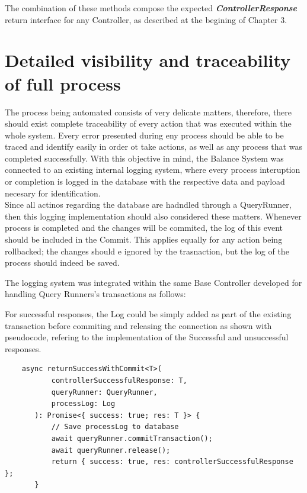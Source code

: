 The combination of these methods compose the expected \textbf{\textit{ControllerResponse}} return interface for any Controller, as described at the begining of Chapter 3.

\section{Detailed visibility and traceability of full process}

The process being automated consists of very delicate matters, therefore, there should exist complete traceability of every action that was executed within the whole system. Every error presented during eny process should be able to be traced and identify easily in order ot take actions, as well as any process that was completed successfully. With this objective in mind, the Balance System was connected to an existing internal logging system, where every process interuption or completion is logged in the database with the respective data and payload necesary for identification.\\

Since all actinos regarding the database are hadndled through a QueryRunner, then this logging implementation should also considered these matters. Whenever process is completed and the changes will be commited, the log of this event should be included in the Commit. This applies equally for any action being rollbacked; the changes should e ignored by the trasnaction, but the log of the process should indeed be saved.

The logging system was integrated within the same Base Controller developed for handling Query Runners's transactions as follows:

For successful responses, the Log could be simply added as part of the existing transaction before commiting and releasing the connection as shown with pseudocode, refering to the implementation of the Successful and unsuccessful responses.

\begin{verbatim}
    async returnSuccessWithCommit<T>(
           controllerSuccessfulResponse: T,
           queryRunner: QueryRunner,
           processLog: Log
       ): Promise<{ success: true; res: T }> {
           // Save processLog to database
           await queryRunner.commitTransaction();
           await queryRunner.release();
           return { success: true, res: controllerSuccessfulResponse };
       }
\end{verbatim}

